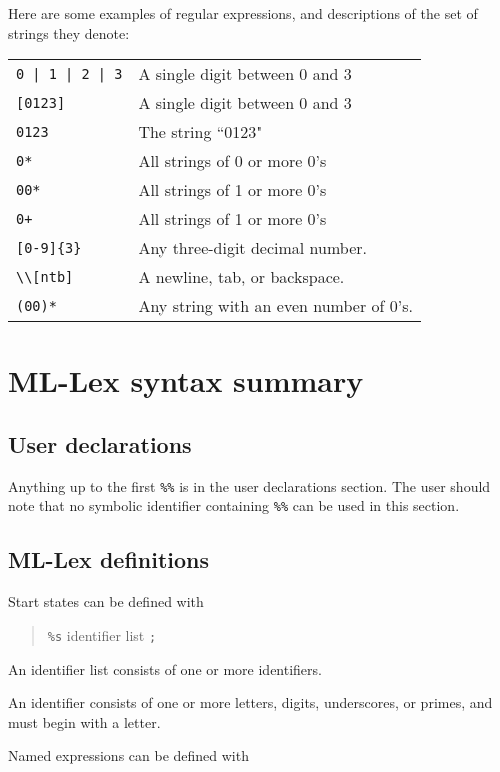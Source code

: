 Here are some examples of regular expressions, and descriptions of the
set of strings they denote:

\begin{tabular}{ll}
\verb~0 | 1 | 2 | 3~&           A single digit between 0 and 3\\
\verb|[0123]|&			A single digit between 0 and 3\\
\verb|0123|&                    The string ``0123"\\
\verb|0*|&                      All strings of 0 or more 0's\\
\verb|00*|&                     All strings of 1  or more 0's\\
\verb|0+|&                      All strings of 1  or more 0's\\
\verb|[0-9]{3}|&		Any three-digit decimal number.\\
\verb|\\[ntb]|&			A newline, tab, or backspace.\\
\verb|(00)*|& Any string with an even number of 0's.
\end{tabular}

\section{ML-Lex syntax summary}

\subsection{User declarations}

Anything up to the first \verb|%%| is in the user declarations section.  The
user should note that no symbolic identifier containing 
\verb|%%| can be
used in this section.

\subsection{ML-Lex definitions}

Start states can be defined with
\begin{quote}
\verb|%s| {identifier list} \verb|;|
\end{quote}

An identifier list consists of one or more identifiers.

An identifier consists of one or more letters, digits, underscores,
or primes, and must begin with a letter.

Named expressions can be defined with

